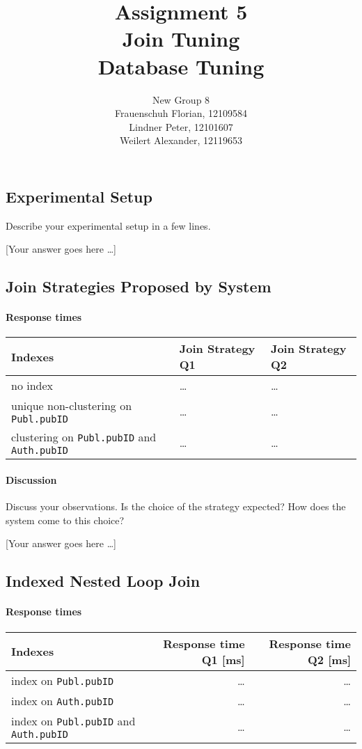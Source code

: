 \documentclass[11pt]{scrartcl}
\title{
  \textbf{\large Assignment 5} \\
  Join Tuning \\
  {\large Database Tuning}}
\author{
  New Group 8 \\
  \large Frauenschuh Florian, 12109584 \\
  \large Lindner Peter, 12101607 \\
  \large Weilert Alexander, 12119653
}
\newcommand{\youranswerhere}{[Your answer goes here \ldots]}
\begin{document}
\maketitle

\subsection*{Experimental Setup}

Describe your experimental setup in a few lines.

\youranswerhere{}

\subsection*{Join Strategies Proposed by System}

\paragraph{Response times}\mbox{}

\begin{table}[H]
  \centering
  \begin{tabular}{l|l|l}
    Indexes & Join Strategy Q1 & Join Strategy Q2 \tabularnewline
    \hline
    no index & \ldots & \ldots \tabularnewline
    unique non-clustering on \texttt{Publ.pubID} & \ldots  & \ldots
      \tabularnewline
    clustering on \texttt{Publ.pubID} and \texttt{Auth.pubID} & \ldots & \ldots
      \tabularnewline
  \end{tabular}
\end{table}

\paragraph{Discussion}

Discuss your observations. Is the choice of the strategy expected? How does the system come to this choice?

\youranswerhere{}

\subsection*{Indexed Nested Loop Join}

\paragraph{Response times}\mbox{}

\begin{table}[H]
  \centering
  \begin{tabular}{l|r|r}
    Indexes & Response time Q1 [ms] & Response time Q2 [ms] \tabularnewline
    \hline
    index on \texttt{Publ.pubID} & \ldots & \ldots \tabularnewline
    index on \texttt{Auth.pubID} & \ldots & \ldots \tabularnewline
    index on \texttt{Publ.pubID} and \texttt{Auth.pubID} & \ldots & \ldots
        \tabularnewline
  \end{tabular}
\end{table}
\end{document}
